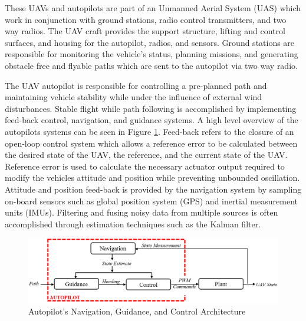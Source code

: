 \documentclass[numbered,pdftex]{ohio-etd}
\begin{document}
These UAVs and autopilots are part of an Unmanned Aerial System (UAS) which work in conjunction with ground stations, radio control transmitters, and two way radios. The UAV craft provides the support structure, lifting and control surfaces, and housing for the autopilot, radios, and sensors. Ground stations are responsible for monitoring the vehicle's status, planning missions, and generating obstacle free and flyable paths which are sent to the autopilot via two way radio. 


The UAV autopilot is responsible for controlling a pre-planned path and maintaining vehicle stability while under the influence of external wind disturbances. Stable flight while path following is accomplished by implementing feed-back control, navigation, and guidance systems. A high level overview of the autopilots systems can be seen in Figure \ref{fig:autopilotloops}. Feed-back refers to the closure of an open-loop control system which allows a reference error to be calculated between the desired state of the UAV, the reference, and the current state of the UAV. Reference error is used to calculate the necessary actuator output required to modify the vehicles attitude and position while preventing unbounded oscillation. Attitude and position feed-back is provided by the navigation system by sampling on-board sensors such as global position system (GPS) and inertial measurement units (IMUs). Filtering and fusing noisy data from multiple sources is often accomplished through estimation techniques such as the Kalman filter. 



\begin{figure}
	\centering
	\includegraphics[width=15cm]{PaperFigures/autopilotLoops}
	\caption{Autopilot's Navigation, Guidance, and Control Architecture}
	\label{fig:autopilotloops}
\end{figure}
\end{document}
